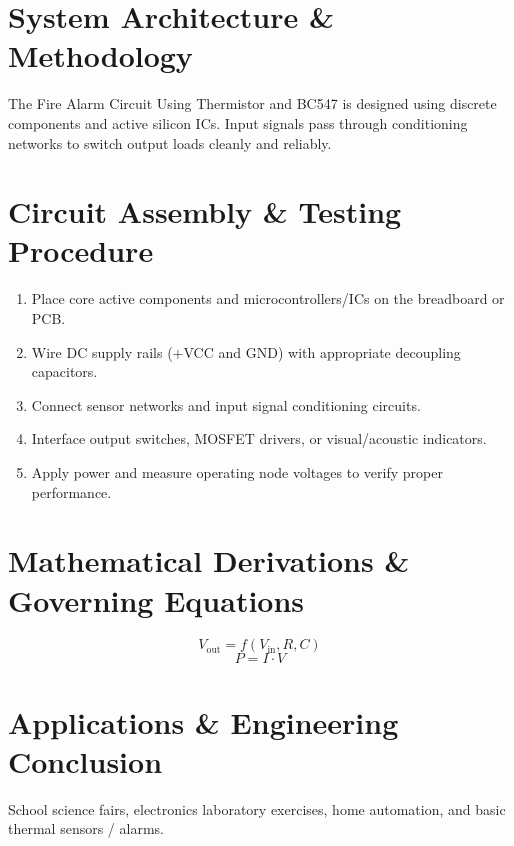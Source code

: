 \documentclass[11pt,a4paper]{article}
\begin{document}
\section{System Architecture \& Methodology}
The Fire Alarm Circuit Using Thermistor and BC547 is designed using discrete components and active silicon ICs. Input signals pass through conditioning networks to switch output loads cleanly and reliably.

\section{Circuit Assembly \& Testing Procedure}
\begin{enumerate}
    \item Place core active components and microcontrollers/ICs on the breadboard or PCB.
    \item Wire DC supply rails (+VCC and GND) with appropriate decoupling capacitors.
    \item Connect sensor networks and input signal conditioning circuits.
    \item Interface output switches, MOSFET drivers, or visual/acoustic indicators.
    \item Apply power and measure operating node voltages to verify proper performance.
\end{enumerate}

\section{Mathematical Derivations \& Governing Equations}
\begin{equation}
V_{\text{out}} = f(V_{\text{in}}, R, C)
\end{equation}
\begin{equation}
P = I \cdot V
\end{equation}

\section{Applications \& Engineering Conclusion}
School science fairs, electronics laboratory exercises, home automation, and basic thermal sensors / alarms.
\end{document}
